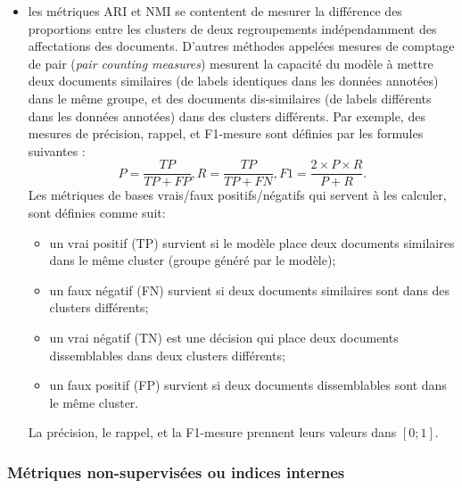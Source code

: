 \begin{itemize}
	\item les métriques ARI et NMI se contentent de mesurer la différence des proportions entre les clusters de deux regroupements indépendamment des affectations des documents. D'autres méthodes appelées mesures de comptage de pair (\textit{pair counting measures}) mesurent la capacité du modèle à mettre deux documents similaires (de labels identiques dans les données annotées) dans le même groupe, et des documents dis-similaires (de labels différents dans les données annotées) dans des clusters différents. Par exemple, des mesures de précision, rappel, et F1-mesure sont définies par les formules suivantes \citep{manning2009irbook-flatclustering}:
	\[P = \frac{{TP}}{{TP} + {FP}}, R = \frac{{TP}}{{TP} + {FN}}, F1 = \frac{2 \times P \times R}{P + R}.\]
	Les métriques de bases vrais/faux positifs/négatifs qui servent à les calculer, sont définies comme suit:
	\begin{itemize}
		\item un vrai positif (TP) survient si le modèle place deux documents similaires dans le même cluster (groupe généré par le modèle);
		\item un faux négatif (FN) survient si deux documents similaires sont dans des clusters différents;
		\item un vrai négatif (TN) est une décision qui place deux documents dissemblables dans deux clusters différents;
		\item un faux positif (FP) survient si deux documents dissemblables sont dans le même cluster.
	\end{itemize}
	
	La précision, le rappel, et la F1-mesure prennent leurs valeurs dans $[0;1]$. 
	
\end{itemize}



\subsubsection{Métriques non-supervisées ou indices internes}
\label{sec:similarite:biblio:unsupeval}

